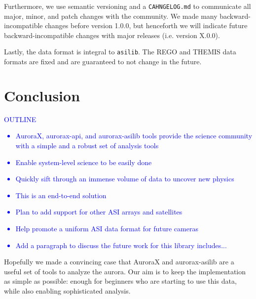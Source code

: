 \documentclass[draft]{agujournal2019}
\begin{document}
Furthermore, we use semantic versioning and a \verb|CAHNGELOG.md| to communicate all major, minor, and patch changes with the community. We made many backward-incompatible changes before version 1.0.0, but henceforth we will indicate future backward-incompatible changes with major releases (i.e. version X.0.0). 

Lastly, the data format is integral to \verb|asilib|. The REGO and THEMIS data formats are fixed and are guaranteed to not change in the future.


\section{Conclusion}

\textcolor{blue}{
      OUTLINE
      \begin{itemize}
            \item AuroraX, aurorax-api, and aurorax-asilib tools provide the science community with a simple and a robust set of analysis tools
            \item Enable system-level science to be easily done
            \item Quickly sift through an immense volume of data to uncover new physics
            \item This is an end-to-end solution
            \item Plan to add support for other ASI arrays and satellites
            \item Help promote a uniform ASI data format for future cameras
            \item Add a paragraph to discuss the future work for this library includes...
      \end{itemize}
}
Hopefully we made a convincing case that AuroraX and aurorax-asilib are a useful set of tools to analyze the aurora. Our aim is to keep the implementation as simple as possible: enough for beginners who are starting to use this data, while also enabling sophisticated analysis.
\end{document}
